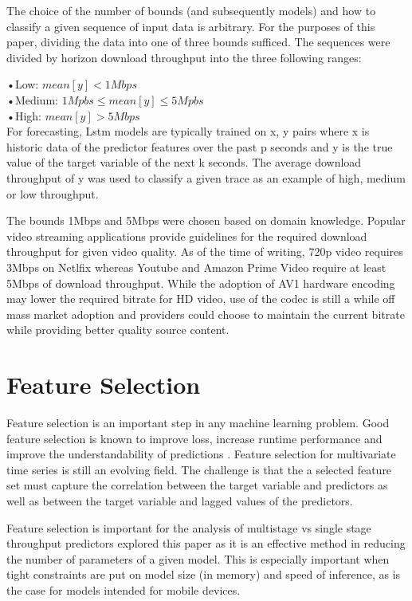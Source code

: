 The choice of the number of bounds (and subsequently models) and how to classify a given sequence of input data is arbitrary. For the purposes of this paper, dividing the data into one of three bounds sufficed. The sequences were divided by horizon download throughput into the three following ranges:

•Low:    $ mean[y] < 1Mbps$ \\
•Medium: $1Mpbs \leq mean[y] \leq 5Mpbs$ \\
•High:   $ mean[y] > 5Mbps$ \\

For forecasting, Lstm models are typically trained on x, y pairs where x is historic data of the predictor features over the past p seconds and y is the true value of the target variable of the next k seconds. The average download throughput of y was used to classify a given trace as an example of high, medium or low throughput.

The bounds 1Mbps and 5Mbps were chosen based on domain knowledge. Popular video streaming applications provide guidelines for the required download throughput for given video quality. As of the time of writing, 720p video requires 3Mbps on Netlfix whereas Youtube and Amazon Prime Video require at least 5Mbps of download throughput. While the adoption of AV1 hardware encoding may lower the required bitrate for HD video, use of the codec is still a while off mass market adoption and providers could choose to maintain the current bitrate while providing better quality source content.

\section{Feature Selection}
Feature selection is an important step in any machine learning problem. Good feature selection is known to improve loss, increase runtime performance and improve the understandability of predictions \cite{guyon2003introduction}.
Feature selection for multivariate time series is still an evolving field. The challenge is that the a selected feature set must capture the correlation between the target variable and predictors as well as between the target variable and lagged values of the predictors.

Feature selection is important for the analysis of multistage vs single stage throughput predictors explored this paper as it is an effective method in reducing the number of parameters of a given model. This is especially important when tight constraints are put on model size (in memory) and speed of inference, as is the case for models intended for mobile devices.

